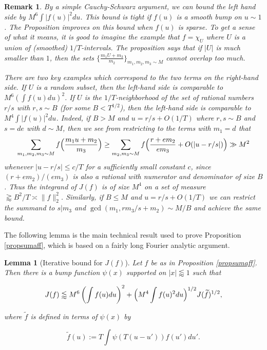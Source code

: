 \documentclass{amsart}
\theoremstyle{plain}
\newtheorem{lmm}[thrm]{Lemma}
\newtheorem*{rmk}{Remark}
\numberwithin{equation}{section}
\renewcommand{\tilde}{\widetilde}
\begin{document}
\begin{rmk}
By a simple Cauchy-Schwarz argument, we can bound the left hand side by $M^6 \int |f(u)|^2 du$.  This bound is tight if $f(u)$ is a smooth bump on $u \sim 1$.  The Proposition improves on this bound when $f(u)$ is sparse.  To get a sense of what it means, it is good to imagine the example that $f = \chi_U$ where $U$ is a union of (smoothed) $1/T$-intervals.  The proposition says that if $|U|$ is much smaller than $1$, then the sets $\{ \frac{m_1 U + m_3}{m_2} \}_{m_1, m_2, m_3 \sim M}$ cannot overlap too much.  

There are two key examples which correspond to the two terms on the right-hand side.  If $U$ is a random subset, then the left-hand side is comparable to $M^6 \left( \int f(u) du \right)^2$.  If $U$ is the $1/T$-neighborhood of the set of rational numbers $r/s$ with $r, s \sim B$ (for some $B<T^{1/2}$), then the left-hand side is comparable to $M^4 \int |f(u)|^2 du$. Indeed, if $B>M$ and $u=r/s+O(1/T)$ where $r,s\sim B$ and $s=d e$ with $d\sim M$, then we see from restricting to the terms with $m_1=d$ that
\[
\sum_{m_1,m_2,m_3\sim M}f\Bigl(\frac{m_1u+m_2}{m_3}\Bigr)\ge \sum_{m_2,m_3\sim M}f\Bigl(\frac{r+em_2}{em_3}+O(|u-r/s|)\Bigr)\gg M^2
\]
whenever $|u-r/s|\le c/T$ for a sufficiently small constant $c$, since $(r+em_2)/(em_3)$ is also a rational with numerator and denominator of size $B$. Thus the integrand of $J(f)$ is of size $M^4$ on a set of measure $\gtrapprox B^2/T\asymp \|f\|^2_2$. Similarly, if $B\le M$ and $u=r/s+O(1/T)$ we can restrict the summand to $s|m_3$ and $\gcd(m_1,rm_3/s+m_2)\sim M/B$ and achieve the same bound.
\end{rmk}

%
%

The following lemma is the main technical result used to prove Proposition \ref{propsumaff}, which is based on a fairly long Fourier analytic argument.

\begin{lmm}[Iterative bound for $J(f)$] \label{lmm:JIteration}Let $f$ be as in Proposition \ref{propsumaff}. Then there is a bump function $\psi(x)$ supported on $|x|\lessapprox 1$ such that

\[J(f)\lessapprox M^6 \left( \int f(u) du \right)^2 + \Bigl(M^4 \int f(u)^2 du\Bigr)^{1/2}J(\tilde{f})^{1/2},\]

where $\tilde{f}$ is defined in terms of $\psi(x)$ by

\[
\tilde{f}(u) := T \int  \psi( T(u - u') ) f(u') du'.
\]

\end{lmm}
\end{document}

